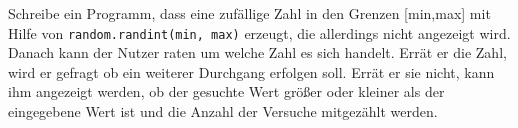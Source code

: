 
Schreibe ein Programm, dass eine zufällige Zahl in den Grenzen [min,max] mit
Hilfe von \texttt{random.randint(min, max)} erzeugt, die allerdings nicht
angezeigt wird. Danach kann der Nutzer raten um welche Zahl es sich handelt.
Errät er die Zahl, wird er gefragt ob ein weiterer Durchgang erfolgen soll.
Errät er sie nicht, kann ihm angezeigt werden, ob der gesuchte Wert größer oder
kleiner als der eingegebene Wert ist und die Anzahl der Versuche mitgezählt
werden.
